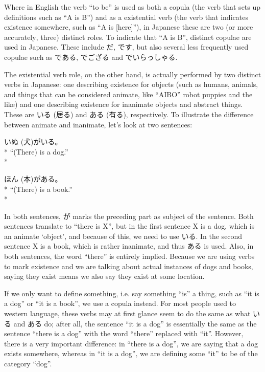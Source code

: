 \documentclass[11pt, b5paper, twoside, openright, onecolumn]{book}
\makeatletter
\newcommand*{\rubystack}[2]{{\relscale{0.5}%
  \begin{tabular}[b]{@{}c@{}}%
    {#1}\\%
   {\textscale{2}{#2}}%
  \end{tabular}}%
}
\DeclareRobustCommand*{\ruby}[2]{%
  \mbox{%
    \setlength{\parskip}{0ex}%
    \BeginAccSupp{method=pdfstringdef,ActualText={#1}}%
      \rubystack{\phantom{#2}}{#1}%
      \llap{%
        \rubystack{#2}{\phantom{#1}}%
      }%
    \EndAccSupp{}%
  }%
}
\renewcommand*{\ruby}[2]{#2 (#1)}%
\newenvironment{exampleblock}{
\setlength{\parindent}{0.6in}
\begin{minipage}[t]{\dimexpr\textwidth-\parindent}}
{\end{minipage}}
\makeatother
\begin{document}
Where in English the verb “to be” is used as both a copula (the verb that sets up definitions such as “A is B”) and as a existential verb (the verb that indicates existence somewhere‚ such as “A is [here]”)‚ in Japanese these are two (or more accurately‚ three) distinct roles. To indicate that “A is B”‚ distinct copulae are used in Japanese. These include だ‚ です‚ but also several less frequently used copulae such as である‚ でござる and でいらっしゃる.

The existential verb role‚ on the other hand‚ is actually performed by two distinct verbs in Japanese: one describing existence for  objects (such as humans‚ animals‚ and things that can be considered animate‚ like “AIBO” robot puppies and the like) and one describing existence for inanimate objects and abstract things. These are いる (居る) and ある (有る)‚ respectively. To illustrate the difference between animate and inanimate‚ let’s look at two sentences:

\vspace{0.4cm}
\begin{exampleblock}
\ruby{犬}{いぬ}がいる。 \\* 
“(There) is a dog.” \\* 
\end{exampleblock}
\vspace{0.2cm}

\begin{exampleblock}
\ruby{本}{ほん}がある。 \\* 
“(There) is a book.” \\* 
\end{exampleblock}
\vspace{0.2cm}

In both sentences‚ が marks the preceding part as subject of the sentence. Both sentences translate to “there is X”‚ but in the first sentence X is a dog‚ which is an animate ‘object’‚ and because of this‚ we need to use いる. In the second sentence X is a book‚ which is rather inanimate‚ and thus ある is used. Also‚ in both sentences‚ the word “there” is entirely implied. Because we are using verbs to mark existence and we are talking about actual instances of dogs and books‚ saying they exist means we also say they exist at some location.

If we only want to define something‚ i.e. say something “is” a thing‚ such as “it is a dog” or “it is a book”‚ we use a copula instead. For most people used to western language‚ these verbs may at first glance seem to do the same as what いる and ある do; after all‚ the sentence “it is a dog” is essentially the same as the sentence “there is a dog” with the word “there” replaced with “it”. However‚ there is a very important difference: in “there is a dog”‚ we are saying that a dog exists somewhere‚ whereas in “it is a dog”‚ we are defining some “it” to be of the category “dog”.
\end{document}
